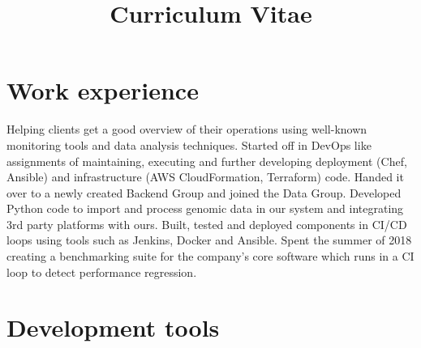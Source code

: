 \documentclass[11pt,a4paper,sans]{moderncv}
\title{Curriculum Vitae}
\begin{document}
\makecvtitle

\section{Work experience}
{Helping clients get a good overview of their operations using well-known
monitoring tools and data analysis techniques.}
{Started off in DevOps like assignments of maintaining, executing and
further developing deployment (Chef, Ansible) and infrastructure (AWS
CloudFormation, Terraform) code. Handed it over to a newly created Backend
Group and joined the Data Group. Developed Python code to import and process
genomic data in our system and integrating 3rd party platforms with ours.
Built, tested and deployed components in CI/CD loops using tools such as
Jenkins, Docker and Ansible. Spent the summer of 2018 creating a benchmarking suite
for the company's core software which runs in a CI loop to detect performance
regression.}

\section{Development tools}
\end{document}
